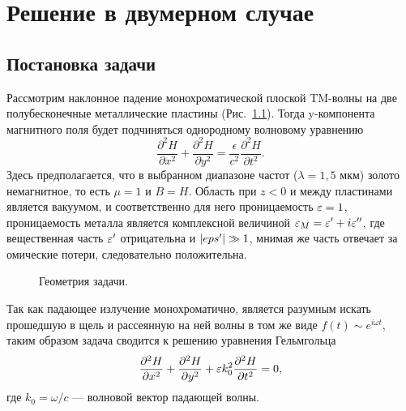 \chapter{Решение в двумерном случае}
\section{Постановка задачи}
 

 Рассмотрим наклонное падение монохроматической плоской TM-волны на две полубесконечные металлические пластины (Рис.~\ref{fig:geom}). 
 Тогда y-компонента магнитного поля будет подчиняться однородному волновому уравнению 
 \begin{equation}
   \frac{\partial^2 H}{\partial x^2} +   \frac{\partial^2 H}{\partial y^2} = \frac{\epsilon}{c^2}\frac{\partial^2 H}{\partial t^2}.
 \end{equation}
 Здесь предполагается, что в выбранном диапазоне частот ($\lambda = 1,5$ мкм) золото немагнитное, то есть $\mu = 1$ и $B = H$. Область при $z<0$ 
 и между пластинами является вакуумом, и соответственно для него проницаемость $\varepsilon = 1$, проницаемость металла является
 комплексной величиной $\varepsilon_M = \varepsilon' + i \varepsilon''$, где вещественная часть $\varepsilon'$ отрицательна и $\lvert eps'\rvert \gg 1$, мнимая же часть 
 отвечает за омические потери, следовательно положительна. 
\begin{figure}
\caption{Геометрия задачи.}
\label{fig:geom}
\end{figure}
Так как падающее излучение монохроматично, является разумным искать прошедшую в щель и рассеянную на ней волны в том же виде 
$f(t) \sim e^{i \omega t}$, таким образом задача сводится к решению уравнения Гельмгольца 
 \begin{equation}
   \frac{\partial^2 H}{\partial x^2} +   \frac{\partial^2 H}{\partial y^2} + \varepsilon k_0^2\frac{\partial^2 H}{\partial t^2} = 0,
   \label{eq:Helmholtz}
 \end{equation}
где $k_0 = \omega/c$ --- волновой вектор падающей волны. 

